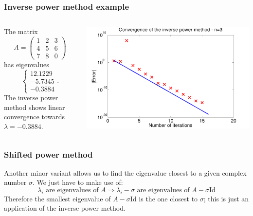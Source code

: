 \documentclass{beamer}
\begin{document}
\begin{frame}
  \frametitle{Inverse power method example}


  \begin{columns}
    \begin{column}{0.35\textwidth}
      The matrix
      \begin{equation*}
        A =
        \begin{pmatrix}
          1 & 2 & 3 \\
          4 & 5 & 6 \\
          7 & 8 & 0
        \end{pmatrix}
      \end{equation*}
      has eigenvalues
      \begin{equation*}
        \left\{
          \begin{array}{c}
            12.1229\\ -5.7345\\ -0.3884
          \end{array}\right. .
      \end{equation*}
      The inverse power method shows linear convergence towards
      $\lambda = -0.3884$.
    \end{column}
    \begin{column}{0.65\textwidth}
      \includegraphics[width=\textwidth]{figures/InversePowerFull1}
    \end{column}
  \end{columns}

\end{frame}

\begin{frame}
  \frametitle{Shifted power method}

  Another minor variant allows us to find the eigenvalue closest to a
  given complex number $\sigma$. We just have to make use of:
  \begin{equation*}
    \lambda_i \text{ are eigenvalues of } A \Rightarrow
    \lambda_i - \sigma \text{ are eigenvalues of } A - \sigma
    \text{Id}
  \end{equation*} \pause
%
  Therefore the smallest eigenvalue of $A - \sigma \text{Id}$ is the
  one closest to $\sigma$; this is just an application of the inverse
  power method.

\end{frame}
\end{document}
